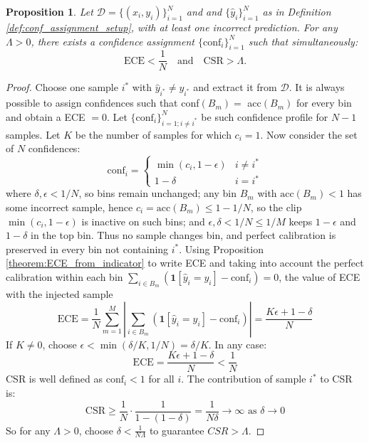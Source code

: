 \documentclass{article}
\theoremstyle{plain}
\newtheorem{theorem}{Proposition}
\theoremstyle{definition}
\theoremstyle{remark}
\begin{document}
\begin{theorem} \label{theorem:csr_and_ece_ortogonality}
Let $\mathcal{D} = \{(x_i, y_i)\}_{i=1}^N$ and  and $\{\hat{y}_i \}_{i=1}^N$ as in Definition \ref{def:conf_assignment_setup}, with at least one incorrect prediction. For any $\Lambda > 0$, there exists a confidence assignment $\{\text{conf}_i\}_{i=1}^N$ such that simultaneously: \[
\text{ECE} <  \frac{1 }{N}   \quad \text{and} \quad \text{CSR} > \Lambda. 
\]
\end{theorem}
\begin{proof}
 Choose one sample $i^*$ with $\hat{y}_{i^*} \neq y_{i^*}$ and extract it from $\mathcal{D}$.  It is always possible to assign confidences such that conf$(B_m) =$ acc$(B_m)$ for every bin and obtain a ECE $= 0$. Let $\{\text{conf}_i\}_{i=1; i \not= i^*}^N$ be such confidence profile for $N - 1$ samples. Let $K$ be the number of samples for which $c_i = 1$.  Now consider the set of $N$ confidences: \[
\text{conf}_i = \begin{cases} \min(c_i, 1 - \epsilon) & i \neq i^* \\ 1 - \delta & i = i^* \end{cases}
\]
where $\delta, \epsilon < 1/N$, so bins remain unchanged; any bin $B_m$ with $\text{acc}(B_m) < 1$ has some incorrect sample, hence $c_i = \text{acc}(B_m) \le 1 - 1/N$, so the clip $\min(c_i, 1-\epsilon)$ is inactive on such bins; and $\epsilon, \delta < 1/N \le 1/M$ keeps $1-\epsilon$ and $1-\delta$ in the top bin. Thus no sample changes bin, and perfect calibration is preserved in every bin not containing $i^*$. Using Proposition \ref{theorem:ECE_from_indicator} to write ECE and taking into account the perfect calibration within each bin $\sum_{i \in B_m} \left(\mathbf{1}[\hat{y}_i = y_i] - \text{conf}_i\right) = 0$, the value of ECE with the injected sample
\[
\text{ECE} = \frac{1}{N}\sum_{m=1}^M \left| \sum_{i \in B_m} \left(\mathbf{1}[\hat{y}_i = y_i] - \text{conf}_i\right) \right| =  \frac{K\epsilon + 1 - \delta }{N}  
\]
If $K \not= 0$, choose $\epsilon < \min(\delta/K, 1/N) =\delta/K$. In any case:
\[
\text{ECE} =  \frac{K\epsilon + 1 - \delta }{N}  <  \frac{1 }{N}  
\]
CSR is well defined as $\text{conf}_i < 1$ for all $i$. The contribution of sample $i^*$ to CSR is: \[
\text{CSR} \geq \frac{1}{N} \cdot \frac{1}{1-(1-\delta)} = \frac{1}{N\delta} \to \infty \text{ as } \delta \to 0 
\]
So for any $\Lambda > 0$, choose $\delta < \frac{1}{N \Lambda}$ to guarantee $CSR > \Lambda$.
\end{proof}
\bigskip
\end{document}
